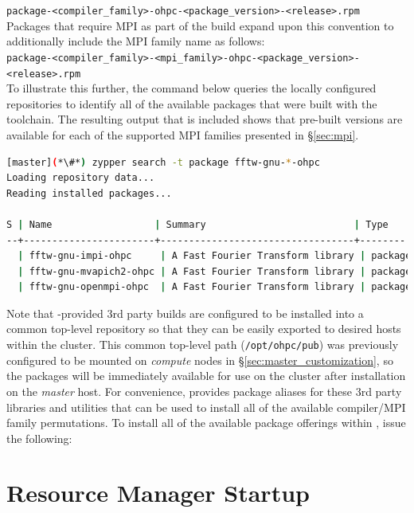 \documentclass[letterpaper]{article}
\begin{document}
\noindent
\texttt{package-<compiler\_family>-ohpc-<package\_version>-<release>.rpm} \\

\noindent Packages that require MPI as part of the build expand upon this convention to
additionally include the MPI family name as follows: \\

\noindent
\texttt{package-<compiler\_family>-<mpi\_family>-ohpc-<package\_version>-<release>.rpm} \\

To illustrate this further, the command below queries the locally configured
repositories to identify all of the available \FFTW{} packages that were built
with the \GNU{} toolchain. The resulting output that is included shows that
pre-built versions are available for each of the supported MPI families
presented in \S\ref{sec:mpi}.

\begin{lstlisting}[language=bash]
[master](*\#*) zypper search -t package fftw-gnu-*-ohpc
Loading repository data...
Reading installed packages...

S | Name                  | Summary                          | Type   
--+-----------------------+----------------------------------+--------
  | fftw-gnu-impi-ohpc     | A Fast Fourier Transform library | package
  | fftw-gnu-mvapich2-ohpc | A Fast Fourier Transform library | package
  | fftw-gnu-openmpi-ohpc  | A Fast Fourier Transform library | package
\end{lstlisting}

Note that \OHPC{}-provided 3rd party builds are configured to be installed
into a common top-level repository so that they can be easily exported to
desired hosts within the cluster. This common top-level path
(\texttt{/opt/ohpc/pub}) was previously configured to be mounted on {\em
  compute} nodes in \S\ref{sec:master_customization}, so the packages will be
immediately available for use on the cluster after installation on the {\em
  master} host.  For convenience, \OHPC{} provides package aliases for these 3rd
party libraries and utilities that can be used to install all of the available
compiler/MPI family permutations. To install all of the available package
offerings within \OHPC{}, issue the following:



\section{Resource Manager Startup} \label{sec:rms_startup}

\end{document}
